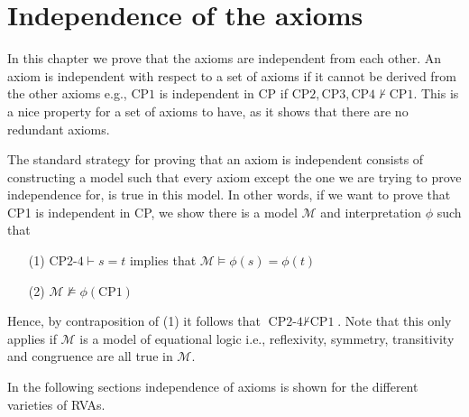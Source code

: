 \documentclass[a4paper,twoside,openright]{report}
\newcommand{\CP}[1]{\ensuremath{\mathrm{CP#1}}}
\begin{document}
\chapter{Independence of the axioms}
In this chapter we prove that the axioms are independent from each other. An axiom is independent with respect to a set of axioms if it cannot be derived from the other axioms e.g., \CP1 is independent in CP if $\CP2,\CP3,\CP4\nvdash \CP1$. This is a nice property for a set of axioms to have, as it shows that there are no redundant axioms.

The standard strategy for proving that an axiom is independent consists of constructing a model such that every axiom except the one we are trying to prove independence for, is true in this model. In other words, if we want to prove that CP1 is independent in CP, we show there is a model $\mathcal{M}$ and interpretation $\phi$ such that
\begin{itemize}
\item[(1)] $\text{CP2-4}\vdash s=t$ implies that $\mathcal{M}\models \phi(s)=\phi(t)$
\item[(2)] $\mathcal{M}\not\models\phi(\text{CP1})$
\end{itemize}
Hence, by contraposition of (1) it follows that $\text{CP2-4}\nvdash\text{CP1}$. Note that this only applies if $\mathcal{M}$ is a model of equational logic i.e., reflexivity, symmetry, transitivity and congruence are all true in $\mathcal{M}$.

In the following sections independence of axioms is shown for the different varieties of RVAs.
\end{document}
